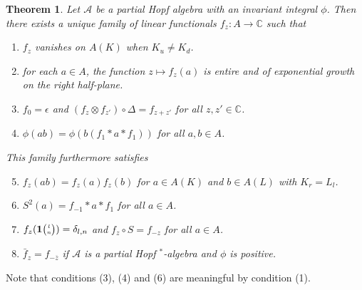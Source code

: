 \documentclass[10pt]{article}
\newcommand{\C}{\mathbb{C}}
\newcommand{\Grt}[3]{#1{\tiny{\begin{pmatrix} #2\\#3\end{pmatrix}}}}
\newcommand{\UnitC}[2]{\Grt{\mathbf{1}}{#1}{#2}}
\newtheorem{Theorem}{Theorem}[section]
\theoremstyle{definition}
\numberwithin{equation}{section}
\begin{document}
\begin{Theorem} \label{thm:rep-characters} Let $\mathscr{A}$ be a
  partial Hopf algebra with an invariant integral $\phi$.  Then there
  exists a unique family of linear functionals $f_{z} \colon A\to \C$
  such that
\begin{enumerate}[label={(\arabic*)}]
  \item $f_z$ vanishes on $A(K)$ when $K_u\neq K_d$.
  \item for each $a\in A$, the function $z\mapsto f_{z}(a)$ is entire
    and of exponential growth on the right half-plane.
  \item $f_{0} = \epsilon$ and $(f_{z} \otimes f_{z'}) \circ 
    \Delta= f_{z+z'}$ for all $z,z' \in \C$.
  \item $\phi(ab)=\phi(b(f_{1} \ast a \ast f_{1}))$ for all $a,b\in A$.
  \end{enumerate}
  This family furthermore satisfies
  \begin{enumerate}[label={(\arabic*)}]\setcounter{enumi}{4}
  \item $f_z(ab) = f_z(a)f_z(b)$ for $a\in A(K)$ and $b\in A(L)$ with $K_r = L_l$. 
  \item $S^{2}(a)=f_{-1} \ast a \ast f_{1}$ for all $a\in A$.
  \item $f_{z}(\UnitC{l}{n})=\delta_{l,n}$ and $f_{z} \circ S = f_{-z}$ for all $a\in A$.
  \item $\bar{f}_{z}=f_{-\overline{z}}$ if $\mathscr{A}$ is a partial
    Hopf $^*$-algebra and $\phi$ is positive.
\end{enumerate}
\end{Theorem}


Note that conditions (3), (4) and (6) are meaningful by condition (1).
\end{document}
